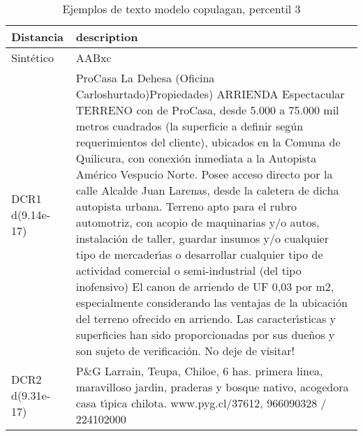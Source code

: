 \begin{table}[H]
\centering
\fontsize{10}{14}\selectfont
\caption{Ejemplos de texto modelo copulagan, percentil 3}
\label{table-example-economicos-b-1-copulagan-3p-text}
\begin{tabular}{|l|m{35em}|}
\hline
\rowcolor[gray]{0.8}
Distancia & description \\
\hline Sintético & AABxc \\
\hline DCR1 d(9.14e-17) & ProCasa La Dehesa (Oficina Carloshurtado)Propiedades) ARRIENDA Espectacular TERRENO con   de ProCasa, desde 5.000 a 75.000 mil metros cuadrados (la superficie a definir seg\'un requerimientos del cliente), ubicados en la Comuna de Quilicura, con conexi\'on inmediata a la Autopista Am\'erico Vespucio Norte. Posee acceso directo por la calle Alcalde Juan Larenas, desde la caletera de dicha autopista urbana.    Terreno apto para el rubro automotriz, con acopio de maquinarias y/o autos, instalaci\'on de taller, guardar insumos y/o cualquier tipo de mercader{\'\i}as o desarrollar cualquier tipo de actividad comercial o semi-industrial (del tipo inofensivo)    El canon de arriendo de UF 0,03 por m2, especialmente considerando las ventajas de la ubicaci\'on del terreno ofrecido en arriendo. Las caracter{\'\i}sticas y superficies han sido proporcionadas por sus due\~nos y son sujeto de verificaci\'on. No deje de visitar! \\
\hline DCR2 d(9.31e-17) & P\&G Larrain, Teupa, Chiloe, 6 has. primera linea, maravilloso jardin, praderas y bosque nativo, acogedora casa t{\'\i}pica chilota. www.pyg.cl/37612, 966090328 / 224102000 \\
\hline
\end{tabular}
\end{table}
